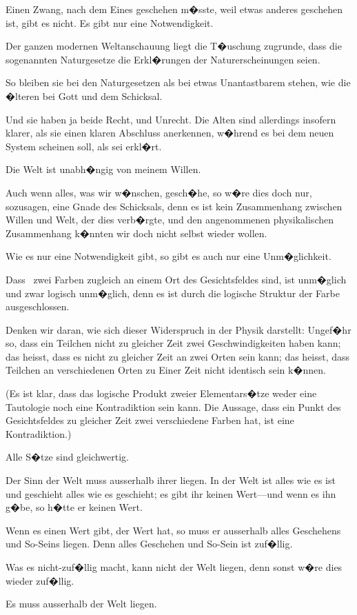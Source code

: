 {Einen Zwang, nach dem Eines geschehen m�sste,
weil etwas anderes geschehen ist, gibt es nicht. Es
gibt nur eine  Notwendigkeit.}


{Der ganzen modernen Weltanschauung liegt die
T�uschung zugrunde, dass die sogenannten Naturgesetze
die Erkl�rungen der Naturerscheinungen
seien.}


{So bleiben sie bei den Naturgesetzen als bei
etwas Unantastbarem stehen, wie die �lteren bei
Gott und dem Schicksal.

Und sie haben ja beide Recht, und Unrecht. Die
Alten sind allerdings insofern klarer, als sie einen
klaren Abschluss anerkennen, w�hrend es bei dem
neuen System scheinen soll, als sei  erkl�rt.}


{Die Welt ist unabh�ngig von meinem Willen.}


{Auch wenn alles, was wir w�nschen, gesch�he,
so w�re dies doch nur, sozusagen, eine Gnade des
Schicksals, denn es ist kein  Zusammenhang
zwischen Willen und Welt, der dies
verb�rgte, und den angenommenen physikalischen
Zusammenhang k�nnten wir doch nicht selbst
wieder wollen.}


{Wie es nur eine  Notwendigkeit gibt,
so gibt es auch nur eine  Unm�glichkeit.}


{Dass \zumBeispiel\ zwei Farben zugleich an einem Ort
des Gesichtsfeldes sind, ist unm�glich und zwar
logisch unm�glich, denn es ist durch die logische
Struktur der Farbe ausgeschlossen.

Denken wir daran, wie sich dieser Widerspruch
in der Physik darstellt: Ungef�hr so, dass ein
Teilchen nicht zu gleicher Zeit zwei Geschwindigkeiten
haben kann; das heisst, dass es nicht zu
gleicher Zeit an zwei Orten sein kann; das heisst,
dass Teilchen an verschiedenen Orten zu Einer Zeit
nicht identisch sein k�nnen.

(Es ist klar, dass das logische Produkt zweier
Elementars�tze weder eine Tautologie noch eine
Kontradiktion sein kann. Die Aussage, dass ein
Punkt des Gesichtsfeldes zu gleicher Zeit zwei
verschiedene Farben hat, ist eine Kontradiktion.)}


{Alle S�tze sind gleichwertig.}


{Der Sinn der Welt muss ausserhalb ihrer liegen.
In der Welt ist alles wie es ist und geschieht alles
wie es geschieht; es gibt  ihr keinen Wert---und
wenn es ihn g�be, so h�tte er keinen Wert.

Wenn es einen Wert gibt, der Wert hat, so muss
er ausserhalb alles Geschehens und So-Seins liegen.
Denn alles Geschehen und So-Sein ist zuf�llig.

Was es nicht-zuf�llig macht, kann nicht  der
Welt liegen, denn sonst w�re dies wieder zuf�llig.

Es muss ausserhalb der Welt liegen.}


